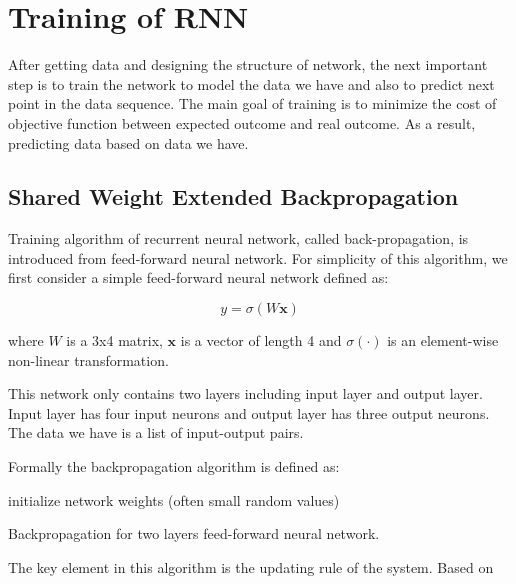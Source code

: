 \documentclass[officiallayout]{tktla}
\begin{document}
\section{Training of RNN}\label{training_rnn}
After getting data and designing the structure of network, the next important step is to train the network to model the data we have and also to predict next point in the data sequence. The main goal of training is to minimize the cost of objective function between expected outcome and real outcome. As a result, predicting data based on data we have.

\subsection{Shared Weight Extended Backpropagation}

Training algorithm of recurrent neural network, called back-propagation, is introduced from feed-forward neural network. For simplicity of this algorithm, we first consider a simple feed-forward neural network defined as:

\begin{equation}
y = \sigma(W\mathbf{x})
\end{equation}

where $W$ is a 3x4 matrix, $\mathbf{x}$ is a vector of length 4 and $\sigma(\cdot)$ is an element-wise non-linear transformation.

This network only contains two layers including input layer and output layer. Input layer has four input neurons and output layer has three output neurons. The data we have is a list of input-output pairs.

Formally the backpropagation algorithm is defined as:

\begin{algorithm}
 initialize network weights (often small random values)\;
 \caption{Backpropagation for two layers feed-forward neural network.}\label{backpropagation}
\end{algorithm}

The key element in this algorithm is the updating rule of the system. Based on 
\end{document}
